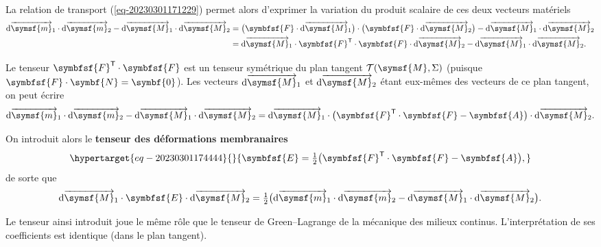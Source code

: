 \documentclass[
  a4paper,
  DIV=11,
  numbers=noendperiod]{scrreprt}
\newcommand{\altvec}[1]{\overrightarrow{#1}}
\newcommand{\D}{{\mathrm d}}
\newcommand{\point}[1]{\symsf{#1}}
\newcommand{\tens}[1]{\symbfsf{#1}}
\newcommand{\transpose}{\mathsf{T}}
\renewcommand{\vec}[1]{\symbf{#1}}
\begin{document}
La relation de transport (\ref{eq-20230301171229}) permet alors
d'exprimer la variation du produit scalaire de ces deux vecteurs
matériels \[
\begin{aligned}[b]
\D\altvec{\point{m}}_1 \cdot \D\altvec{\point{m}}_2 - \D\altvec{\point{M}}_1 \cdot \D\altvec{\point{M}}_2
&= \bigl(\tens{F} \cdot \D\altvec{\point{M}}_1 \bigr) \cdot \bigl(\tens{F} \cdot \D\altvec{\point{M}}_2 \bigr) - \D\altvec{\point{M}}_1 \cdot \D\altvec{\point{M}}_2\\
&= \D\altvec{\point{M}}_1 \cdot \tens{F}^\transpose \cdot \tens{F} \cdot \D\altvec{\point{M}}_2 - \D\altvec{\point{M}}_1 \cdot \D\altvec{\point{M}}_2.
\end{aligned}
\]

Le tenseur \(\tens{F}^\transpose \cdot \tens{F}\) est un tenseur
symétrique du plan tangent \(\mathcal{T}(\point{M}, \Sigma)\) (puisque
\(\tens{F} \cdot \vec{N} = \vec{0}\)). Les vecteurs
\(\D\altvec{\point{M}}_1\) et \(\D\altvec{\point{M}}_2\) étant eux-mêmes
des vecteurs de ce plan tangent, on peut écrire \[
\D\altvec{\point{m}}_1 \cdot \D\altvec{\point{m}}_2 - \D\altvec{\point{M}}_1 \cdot \D\altvec{\point{M}}_2 = \D\altvec{\point{M}}_1 \cdot \bigl( \tens{F}^\transpose \cdot \tens{F} - \tens{A} \bigr) \cdot \D\altvec{\point{M}}_2.
\]

On introduit alors le \textbf{tenseur des déformations membranaires}
\begin{equation}\protect\hypertarget{eq-20230301174444}{}{
\tens{E} = \tfrac{1}{2} \bigl( \tens{F}^\transpose \cdot \tens{F} - \tens{A} \bigr),
}\label{eq-20230301174444}\end{equation} de sorte que \[
\D\altvec{\point{M}}_1 \cdot \tens{E} \cdot \D\altvec{\point{M}}_2 = \tfrac{1}{2} \bigl( \D\altvec{\point{m}}_1 \cdot \D\altvec{\point{m}}_2 - \D\altvec{\point{M}}_1 \cdot \D\altvec{\point{M}}_2 \bigr).
\]

\begin{tcolorbox}[enhanced jigsaw, toptitle=1mm, title=\textcolor{quarto-callout-note-color}{\faInfo}\hspace{0.5em}{Note}, colbacktitle=quarto-callout-note-color!10!white, toprule=.15mm, left=2mm, bottomrule=.15mm, arc=.35mm, breakable, opacityback=0, colframe=quarto-callout-note-color-frame, bottomtitle=1mm, titlerule=0mm, leftrule=.75mm, opacitybacktitle=0.6, coltitle=black, rightrule=.15mm, colback=white]

Le tenseur ainsi introduit joue le même rôle que le tenseur de
Green--Lagrange de la mécanique des milieux continus. L'interprétation
de ses coefficients est identique (dans le plan tangent).

\end{tcolorbox}
\end{document}
